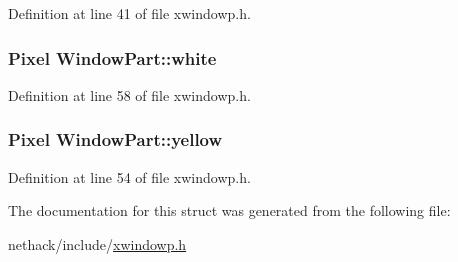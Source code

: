 Definition at line 41 of file xwindowp.\+h.

\hypertarget{structWindowPart_afb94901758f1adb37e099156d7c490f2}{
\subsubsection[{white}]{\setlength{\rightskip}{0pt plus 5cm}Pixel Window\+Part\+::white}}\label{structWindowPart_afb94901758f1adb37e099156d7c490f2}


Definition at line 58 of file xwindowp.\+h.

\hypertarget{structWindowPart_a581e30a1cf0fca459d1faf6166e3f837}{
\subsubsection[{yellow}]{\setlength{\rightskip}{0pt plus 5cm}Pixel Window\+Part\+::yellow}}\label{structWindowPart_a581e30a1cf0fca459d1faf6166e3f837}


Definition at line 54 of file xwindowp.\+h.



The documentation for this struct was generated from the following file\+:\begin{DoxyCompactItemize}
\item 
nethack/include/\hyperlink{xwindowp_8h}{xwindowp.\+h}\end{DoxyCompactItemize}
